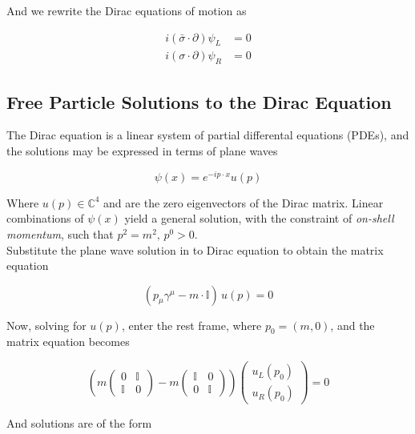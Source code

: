 \noindent And we rewrite the Dirac equations of motion as

\begin{align}
i (\bar{\sigma} \cdot \partial) \psi_L &= 0 \\
i (\sigma \cdot \partial) \psi_R &= 0 
\end{align}

\subsection*{Free Particle Solutions to the Dirac Equation}

\noindent The Dirac equation is a linear system of partial differental equations (PDEs), and the solutions may be expressed in terms of plane waves

\begin{equation}
\psi(x) = e^{-i p \cdot x} u(p)
\end{equation}

\noindent Where $u(p) \in \mathbb{C}^4$ and are the zero eigenvectors of the Dirac matrix. Linear combinations of $\psi(x)$ yield a general solution, with the constraint of \textit{on-shell momentum}, such that $p^2 = m^2, \, p^0 > 0$. \\

\noindent Substitute the plane wave solution in to Dirac equation to obtain the matrix equation

\begin{equation}
(p_\mu \gamma^\mu - m \cdot \mathbb{I}) \, u(p) = 0
\end{equation}

\noindent Now, solving for $u(p)$, enter the rest frame, where $p_0 = (m,0)$, and the matrix equation becomes

\begin{equation}
\left( m \left( \begin{array}{cc} 0 & \mathbb{I} \\ \mathbb{I} & 0 \end{array} \right) - m \left( \begin{array}{cc} \mathbb{I} & 0 \\ 0 & \mathbb{I} \end{array} \right)  \right) \left( \begin{array}{c} u_L(p_0) \\ u_R(p_0) \end{array} \right) = 0
\end{equation}

\noindent And solutions are of the form

